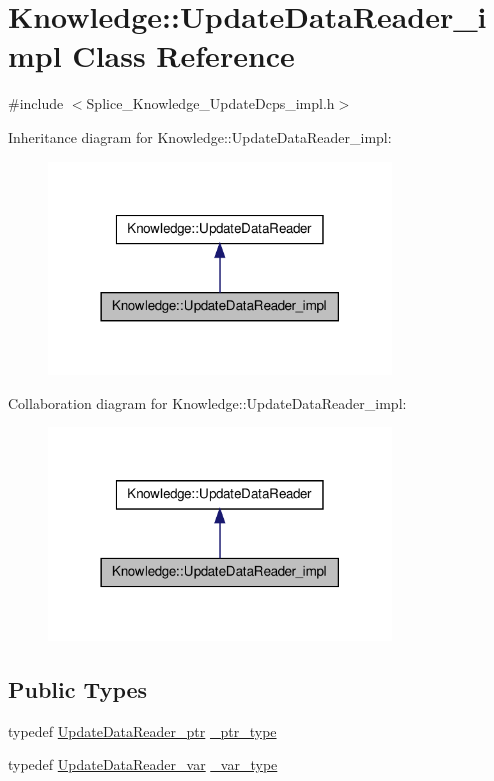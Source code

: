 \hypertarget{classKnowledge_1_1UpdateDataReader__impl}{
\section{Knowledge::UpdateDataReader\_\-impl Class Reference}
\label{de/d78/classKnowledge_1_1UpdateDataReader__impl}
}


{\ttfamily \#include $<$Splice\_\-Knowledge\_\-UpdateDcps\_\-impl.h$>$}



Inheritance diagram for Knowledge::UpdateDataReader\_\-impl:
\nopagebreak
\begin{figure}[H]
\begin{center}
\leavevmode
\includegraphics[width=258pt]{df/d4a/classKnowledge_1_1UpdateDataReader__impl__inherit__graph}
\end{center}
\end{figure}


Collaboration diagram for Knowledge::UpdateDataReader\_\-impl:
\nopagebreak
\begin{figure}[H]
\begin{center}
\leavevmode
\includegraphics[width=258pt]{d0/d25/classKnowledge_1_1UpdateDataReader__impl__coll__graph}
\end{center}
\end{figure}
\subsection*{Public Types}
\begin{DoxyCompactItemize}
\item 
typedef \hyperlink{classKnowledge_1_1UpdateDataReader}{UpdateDataReader\_\-ptr} \hyperlink{classKnowledge_1_1UpdateDataReader_a5aa1e0d7df2df2db07892433815c0864}{\_\-ptr\_\-type}
\item 
typedef \hyperlink{namespaceKnowledge_acbf12106aaac4bdb65b120d8c2f38757}{UpdateDataReader\_\-var} \hyperlink{classKnowledge_1_1UpdateDataReader_a4300e2956b49cd500ba1024e4d7c54a7}{\_\-var\_\-type}
\end{DoxyCompactItemize}
